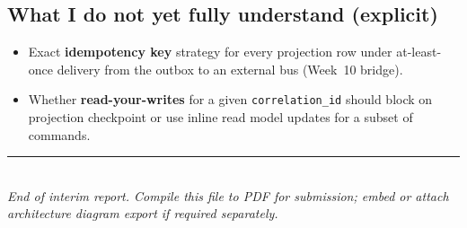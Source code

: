 \documentclass[11pt,a4paper]{article}
\begin{document}
\subsection{What I do not yet fully understand (explicit)}

\begin{itemize}[leftmargin=*]
  \item Exact \textbf{idempotency key} strategy for every projection row under at-least-once delivery from the outbox to an external bus (Week~10 bridge).
  \item Whether \textbf{read-your-writes} for a given \texttt{correlation\_id} should block on projection checkpoint or use inline read model updates for a subset of commands.
\end{itemize}

\vspace{1em}
\noindent\rule{\textwidth}{0.4pt}\\
\textit{End of interim report. Compile this file to PDF for submission; embed or attach architecture diagram export if required separately.}
\end{document}
